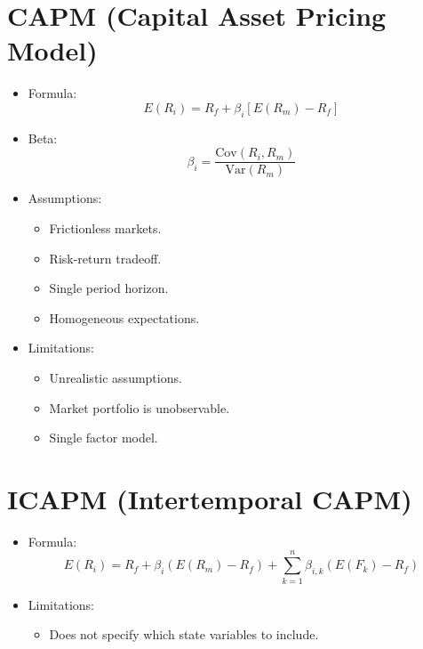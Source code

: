 \documentclass[twoside,openany]{book}
\begin{document}
\section*{CAPM (Capital Asset Pricing Model)}
\begin{itemize}
    \item Formula:
    \[ E(R_i) = R_f + \beta_i [E(R_m) - R_f] \]
    \item Beta:
    \[ \beta_i = \frac{\text{Cov}(R_i, R_m)}{\text{Var}(R_m)} \]
    \item Assumptions:
    \begin{itemize}
        \item Frictionless markets.
        \item Risk-return tradeoff.
        \item Single period horizon.
        \item Homogeneous expectations.
    \end{itemize}
    \item Limitations:
    \begin{itemize}
        \item Unrealistic assumptions.
        \item Market portfolio is unobservable.
        \item Single factor model.
    \end{itemize}
\end{itemize}

\section*{ICAPM (Intertemporal CAPM)}
\begin{itemize}
    \item Formula:
    \[ E(R_i) = R_f + \beta_i (E(R_m) - R_f) + \sum_{k=1}^{n}\beta_{i,k} (E(F_k) - R_f) \]
    \item Limitations:
    \begin{itemize}
        \item Does not specify which state variables to include.
    \end{itemize}
\end{itemize}
\end{document}
